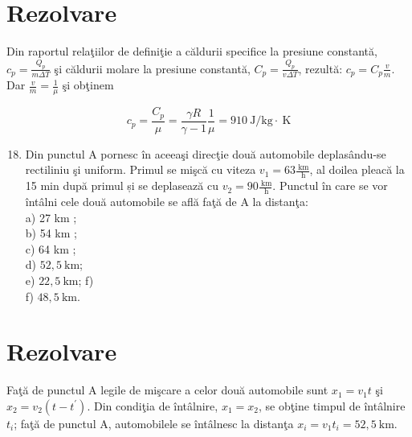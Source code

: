 \section*{Rezolvare}
Din raportul relaţiilor de definiţie a căldurii specifice la presiune constantă, $c_{p}=\frac{Q_{p}}{m \Delta T}$ şi căldurii molare la presiune constantă, $C_{p}=\frac{Q_{p}}{v \Delta T}$, rezultă: $c_{p}=C_{p} \frac{v}{m}$. Dar $\frac{v}{m}=\frac{1}{\mu}$ şi obţinem

$$
c_{p}=\frac{C_{p}}{\mu}=\frac{\gamma R}{\gamma-1} \frac{1}{\mu}=910 \mathrm{~J} / \mathrm{kg} \cdot \mathrm{~K}
$$

\begin{enumerate}
  \setcounter{enumi}{17}
  \item Din punctul A pornesc în aceeaşi direcţie două automobile deplasându-se rectiliniu şi uniform. Primul se mişcă cu viteza $v_{1}=63 \frac{\mathrm{~km}}{\mathrm{~h}}$, al doilea pleacă la 15 min după primul și se deplasează cu $v_{2}=90 \frac{\mathrm{~km}}{\mathrm{~h}}$. Punctul în care se vor întâlni cele două automobile se află faţă de A la distanţa:\\
a) 27 km ;\\
b) 54 km ;\\
c) 64 km ;\\
d) $52,5 \mathrm{~km}$;\\
e) $22,5 \mathrm{~km}$; f)\\
f) $48,5 \mathrm{~km}$.
\end{enumerate}

\section*{Rezolvare}
Faţă de punctul A legile de mişcare a celor două automobile sunt $x_{1}=v_{1} t$ şi $x_{2}=v_{2}\left(t-t^{\prime}\right)$. Din condiţia de întâlnire, $x_{1}=x_{2}$, se obţine timpul de întâlnire $t_{i}$; faţă de punctul A, automobilele se întâlnesc la distanţa $x_{i}=v_{1} t_{i}=52,5 \mathrm{~km}$.
